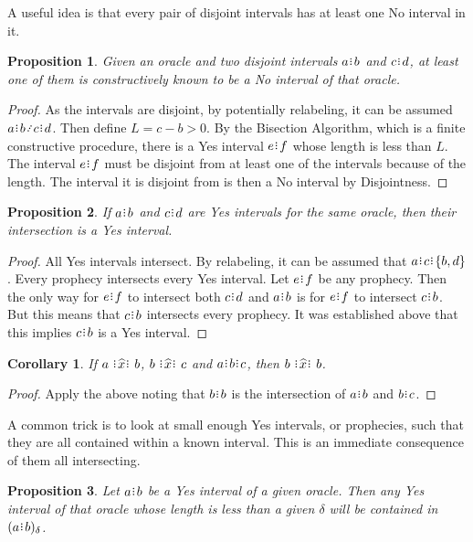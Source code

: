 \documentclass[12pt]{article}
\newtheorem{corollary}{Corollary}[section]
\newtheorem{proposition}{Proposition}[section]
\begin{document}
A useful idea is that every pair of disjoint intervals has at least one No interval in it. 

\begin{proposition}
    Given an oracle and two disjoint intervals $a\rint b$ and $c\rint d$, at least one of them is constructively known to be a No interval of that oracle. 
\end{proposition}

\begin{proof}
    As the intervals are disjoint, by potentially relabeling, it can be assumed $a\rint b \lte c\rint d$. Then define $L = c-b > 0$. By the Bisection Algorithm, which is a finite constructive procedure, there is a Yes interval $e\rint f$ whose length is less than $L$. The interval $e\rint f$ must be disjoint from at least one of the intervals because of the length. The interval it is disjoint from is then a No interval by Disjointness. 
\end{proof}

   
\begin{proposition}
    If $ a\rint b$ and $c\rint d$ are Yes intervals for the same oracle, then their intersection is a Yes interval. 
\end{proposition}

\begin{proof}
    All Yes intervals intersect. By relabeling, it can be assumed that $a \rint c \rint \{b, d\}$. Every prophecy intersects every Yes interval. Let $e\rint f$ be any prophecy. Then the only way for $e\rint f$ to intersect both $c\rint d$ and $a\rint b$ is for $e\rint f$ to intersect $c\rint b$.  But this means that $c\rint b$ intersects every prophecy. It was established above that this implies $c\rint b$ is a Yes interval. 
\end{proof}

\begin{corollary}
    If $a \xora b$, $b \xora c$ and $a\rint b\rint c$, then $b \xora b$.
\end{corollary}

\begin{proof}
    Apply the above noting that $b\rint b$ is the intersection of $a\rint b$ and $b\rint c$.
\end{proof}

A common trick is to look at small enough Yes intervals, or prophecies, such that they are all contained within a known interval. This is an immediate consequence of them all intersecting. 

\begin{proposition}\label{os-yescontain}
    Let $a\rint b$ be a Yes interval of a given oracle. Then any Yes interval of that oracle whose length is less than a given $\delta$ will be contained in $\halo{a\rint b}$.
\end{proposition}
\end{document}
